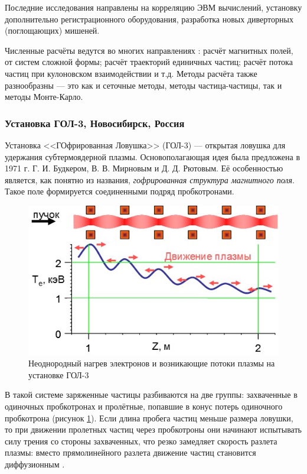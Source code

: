 Последние исследования направлены на корреляцию ЭВМ вычислений, установку дополнительно регистрационного оборудования, разработка новых диверторных (поглощающих) мишеней\cite{imai2013gamma}.

Численные расчёты ведутся во многих направлениях \cite{gamma10_code}: расчёт магнитных полей, от систем сложной формы; расчёт траекторий единичных частиц; расчёт потока частиц при кулоновском взаимодействии и т.д. Методы расчёта также разнообразны --- это как и сеточные методы, методы частица-частицы, так и методы Монте-Карло.


\subsubsection{Установка ГОЛ-3, Новосибирск, Россия}

Установка <<ГОфрированная Ловушка>> (ГОЛ-3) --- открытая ловушка для удержания субтермоядерной плазмы. Основополагающая идея была предложена в 1971 г. Г. И. Будкером, В. В. Мирновым и Д. Д. Рютовым. Её особенностью является, как понятно из названия, \textit{гофрированная структура магнитного поля}. Такое поле формируется соединенными подряд пробкотронами.

\begin{figure}[h]
\centering
\includegraphics[width=0.7\linewidth]{./fig/ch1/GOL-3_02-03}
\caption{Неоднородный нагрев электронов и возникающие потоки плазмы на установке ГОЛ-3}
\label{fig:GOL-3_02-03}
\end{figure}


В такой системе заряженные частицы разбиваются на две группы: захваченные в одиночных пробкотронах и пролётные, попавшие в конус потерь одиночного пробкотрона (рисунок \ref{fig:GOL-3_02-03}). Если длина пробега частиц меньше размера ловушки, то при движении пролетных частиц через пробкотроны они начинают испытывать силу трения со стороны захваченных, что резко замедляет скорость разлета плазмы: вместо прямолинейного разлета движение частиц становится диффузионным \cite{gol3_review}.


